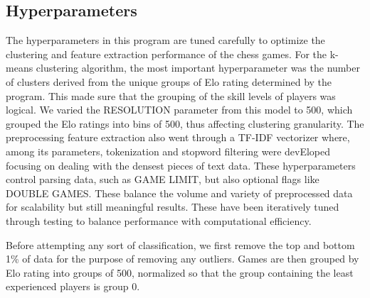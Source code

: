 \documentclass[conference]{IEEEtran}
\begin{document}
\subsection{Hyperparameters}
The hyperparameters in this program are tuned carefully to optimize the clustering and feature extraction performance of the chess games. For the k-means clustering algorithm, the most important hyperparameter was the number of clusters derived from the unique groups of Elo rating determined by the program. This made sure that the grouping of the skill levels of players was logical. We varied the RESOLUTION parameter from this model to 500, which grouped the Elo ratings into bins of 500, thus affecting clustering granularity. The preprocessing feature extraction also went through a TF-IDF vectorizer where, among its parameters, tokenization and stopword filtering were devEloped focusing on dealing with the densest pieces of text data. These hyperparameters control parsing data, such as GAME LIMIT, but also optional flags like DOUBLE GAMES. These balance the volume and variety of preprocessed data for scalability but still meaningful results. These have been iteratively tuned through testing to balance performance with computational efficiency.

Before attempting any sort of classification, we first remove the top and bottom 1\% of data for the purpose of removing any outliers. Games are then grouped by Elo rating into groups of 500, normalized so that the group containing the least experienced players is group 0.
\end{document}
